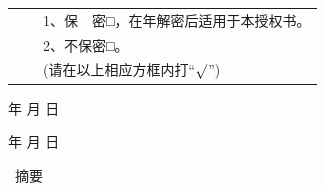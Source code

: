 {{            \vspace{0.5cm}
            \begin{center}\hei\xiaoer{\@authorizedtitle}\end{center}\par
            \vspace{0.5\baselineskip}
            \song{}\par
            \song{}\par
            \begin{tabular}{lll}
                \qquad\qquad&\qquad\quad\qquad&\hspace{0.5em} 1、保　密□，在\underline{\qquad\qquad}年解密后适用于本授权书。 \\
                \qquad\qquad&\qquad\quad\qquad&\hspace{0.5em} 2、不保密□。                                       \\
                \qquad\qquad&\qquad\quad\qquad&\hspace{0.5em} (请在以上相应方框内打``$\surd$'')
            \end{tabular}
            \par
            \vspace{1\baselineskip}
            \song\xiaosi
            \@studentsign \makebox[3cm][s]{} \qquad\qquad\qquad  
            \@cdatename \the\year{} 年 \makebox[0.5cm][s]{} 月 \makebox[0.5cm][s]{} 日\par
            \vspace{0.25\baselineskip}
            \@teachersign \makebox[3cm][s]{} \qquad\qquad\qquad  
            \@cdatename \the\year{} 年 \makebox[0.5cm][s]{} 月 \makebox[0.5cm][s]{} 日
        }
        \clearpage

         {
            \begin{center}
                \hei\xiaoer{\@title}
            \end{center}\par
            \vspace{0.5\baselineskip}
            \begin{center}
                \hei\xiaoer\ 摘\qquad 要
            \end{center}\par
            \vspace{0.5\baselineskip}
            \song{}\@cabstract
            \vspace{\baselineskip}
            \hangindent=52.3pt
            \newline\noindent
            {\hei{} \hei\xiaosi\@ckeywords}
        }
        \clearpage
        
}
